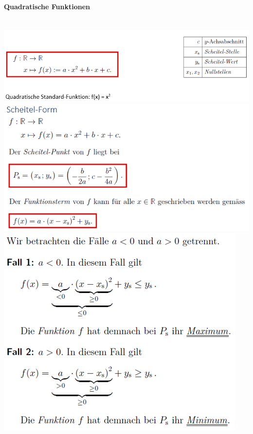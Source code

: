 \paragraph{Quadratische Funktionen}\mbox{}\\
\noindent
\includegraphics[width=\columnwidth]{./images/quad.png}
\includegraphics[width=\columnwidth]{./images/quad1.png}
\includegraphics[width=\columnwidth]{./images/quad2.png}
